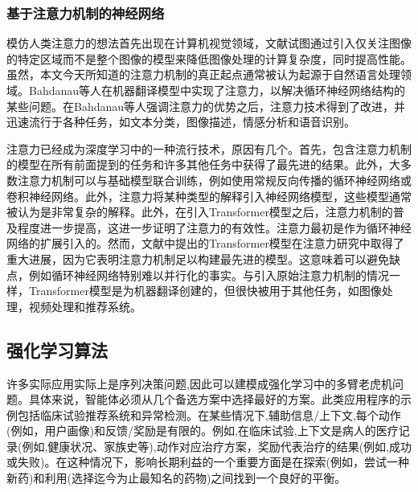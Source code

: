 \subsubsection{基于注意力机制的神经网络}
模仿人类注意力的想法首先出现在计算机视觉领域，文献\cite{mnih2014recurrent}试图通过引入仅关注图像的特定区域而不是整个图像的模型来降低图像处理的计算复杂度，同时提高性能。虽然，本文今天所知道的注意力机制的真正起点通常被认为起源于自然语言处理领域。Bahdanau等人在机器翻译模型中实现了注意力，以解决循环神经网络结构的某些问题。在Bahdanau等人强调注意力的优势之后，注意力技术得到了改进，并迅速流行于各种任务，如文本分类，图像描述，情感分析和语音识别。\par
注意力已经成为深度学习中的一种流行技术，原因有几个。首先，包含注意力机制的模型在所有前面提到的任务和许多其他任务中获得了最先进的结果。此外，大多数注意力机制可以与基础模型联合训练，例如使用常规反向传播的循环神经网络或卷积神经网络。此外，注意力将某种类型的解释引入神经网络模型，这些模型通常被认为是非常复杂的解释。此外，在引入Transformer模型之后，注意力机制的普及程度进一步提高，这进一步证明了注意力的有效性。注意力最初是作为循环神经网络的扩展引入的。然而，文献\cite{vaswani2017attention}中提出的Transformer模型在注意力研究中取得了重大进展，因为它表明注意力机制足以构建最先进的模型。这意味着可以避免缺点，例如循环神经网络特别难以并行化的事实。与引入原始注意力机制的情况一样，Transformer模型是为机器翻译创建的，但很快被用于其他任务，如图像处理，视频处理和推荐系统。

\subsection{强化学习算法}
许多实际应用实际上是序列决策问题,因此可以建模成强化学习中的多臂老虎机问题。具体来说，智能体必须从几个备选方案中选择最好的方案。此类应用程序的示例包括临床试验推荐系统和异常检测。在某些情况下,辅助信息/上下文,每个动作(例如，用户画像)和反馈/奖励是有限的。例如,在临床试验,上下文是病人的医疗记录(例如,健康状况、家族史等),动作对应治疗方案，奖励代表治疗的结果(例如,成功或失败)。在这种情况下，影响长期利益的一个重要方面是在探索(例如，尝试一种新药)和利用(选择迄今为止最知名的药物)之间找到一个良好的平衡。

